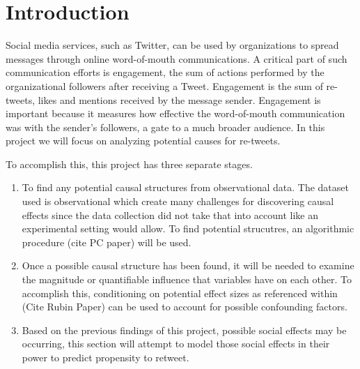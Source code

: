 \section{Introduction}
\label{sec:introduction}

Social media services, such as Twitter, can be used by organizations to spread messages through online word-of-mouth communications.  A critical part of such communication efforts is engagement, the sum of actions performed by the organizational followers after receiving a Tweet.  Engagement is the sum of re-tweets, likes and mentions received by the message sender.  Engagement is important because it measures how effective the word-of-mouth communication was with the sender’s followers, a gate to a much broader audience.  In this project we will focus on analyzing potential causes for re-tweets.  


To accomplish this, this project has three separate stages. 
\begin{enumerate}
\item To find any potential causal structures from observational data. The dataset used is observational which create many challenges for discovering causal effects since the data collection did not take that into account like an experimental setting would allow. To find potential strucutres, an algorithmic procedure (cite PC paper) will be used. 
\item Once a possible causal structure has been found, it will be needed to examine the magnitude or quantifiable influence that variables have on each other. To accomplish this, conditioning on potential effect sizes as referenced within (Cite Rubin Paper) can be used to account for possible confounding factors. 
\item Based on the previous findings of this project, possible social effects may be occurring, this section will attempt to model those social effects in their power to predict propensity to retweet. 
\end{enumerate}

